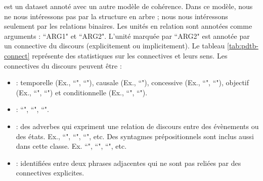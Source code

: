 \documentclass{KodeBook}
\begin{document}
 est un dataset annoté avec un autre modèle de cohérence. 
Dans ce modèle, nous ne nous intéressons pas par la structure en arbre ; nous nous intéressons seulement par les relations binaires. 
Les unités en relation sont annotées comme arguments : ``ARG1" et ``ARG2". 
L'unité marquée par ``ARG2" est annotée par un connective du discours (explicitement ou implicitement). 
Le tableau \ref{tab:pdtb-connect} représente des statistiques sur les connectives et leurs sens.
Les connectives du discours peuvent être :
\begin{itemize}
	\item {} :  
	temporelle (Ex., ``", ``"), 
	causale (Ex., ``"), 
	concessive (Ex., ``", ``"), 
	objectif (Ex., ``", ``") et 
	conditionnelle (Ex., ``", ``").
	
	\item {} : ``", ``", ``".
	
	\item {} : des adverbes qui expriment une relation de discours entre des évènements ou des états. Ex., ``", ``", ``", etc.
	Des syntagmes prépositionnels sont inclus aussi dans cette classe. Ex. ``",
		``", ``", etc.
	
	\item {} :  identifiées entre deux phrases adjacentes qui ne sont pas reliées par des connectives explicites.
\end{itemize}
\end{document}
